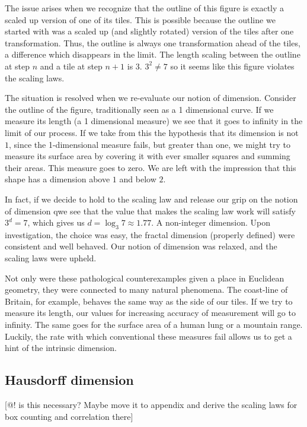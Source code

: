 \documentclass[11pt]{article}
\begin{document}
The issue arises when we recognize that the outline of this figure is exactly a scaled up version of one of its tiles. This is possible because the outline we started with was a scaled up (and slightly rotated) version of the tiles after one transformation. Thus, the outline is always one transformation ahead of the tiles, a difference which disappears in the limit. The length scaling between the outline at step $n$ and a tile at step $n+1$ is $3$. $3^2 \neq 7$ so it seems like this figure violates the scaling laws. 

The situation is resolved when we re-evaluate our notion of dimension. Consider the outline of the figure, traditionally seen as a 1 dimensional curve. If we measure its length (a 1 dimensional measure) we see that it goes to infinity in the limit of our process. If we take from this the hypothesis that its dimension is not $1$, since the 1-dimensional measure fails, but greater than one, we might try to measure its surface area by covering it with ever smaller squares and summing their areas. This measure goes to zero. We are left with the impression that this shape has a dimension above $1$ and below $2$.

In fact, if we decide to hold to the scaling law and release our grip on the notion of dimension qwe see that the value that makes the scaling law work will satisfy $3^d = 7$, which gives us  $d = \log_3 7 \approx 1.77$. A non-integer dimension. Upon investigation, the choice was easy, the fractal dimension (properly defined) were consistent and well behaved. Our notion of dimension was relaxed, and the scaling laws were upheld.

Not only were these pathological counterexamples given a place in Euclidean geometry, they were connected to many natural phenomena. The coast-line of Britain, for example, behaves the same way as the side of our tiles. If we try to measure its length, our values for increasing accuracy of measurement will go to infinity. The same goes for the surface area of a human lung or a mountain range. Luckily, the rate with which conventional these measures fail allows us to get a hint of the intrinsic dimension.

\subsection{Hausdorff dimension}

[@! is this necessary? Maybe move it to appendix and derive the scaling laws for box counting and correlation there]  
\end{document}
